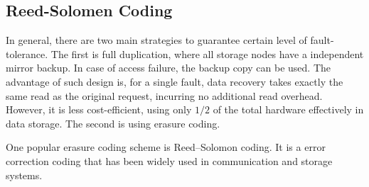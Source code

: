 %


\subsection{Reed-Solomen Coding}

In general, there are two main strategies to guarantee certain level of fault-tolerance. The first is full duplication, where all storage nodes have a independent mirror backup. In case of access failure, the backup copy can be used. The advantage of such design is, for a single fault, data recovery takes exactly the same read as the original request, incurring no additional read overhead. However, it is less cost-efficient, using only $1/2$ of the total hardware effectively in data storage. The second is using erasure coding.

One popular erasure coding scheme is Reed–Solomon coding. It is a error correction coding that has been widely used in communication and storage systems.